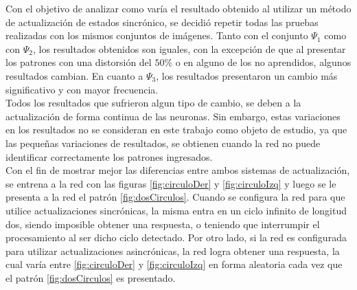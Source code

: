 \documentclass{sig-alternate}
\begin{document}
Con el objetivo de analizar como varía el resultado obtenido al utilizar un método de actualización de estados sincrónico, se decidió repetir todas las pruebas realizadas con los mismos conjuntos de imágenes. Tanto con el conjunto $\Psi_1$ como con $\Psi_2$, los resultados obtenidos son iguales, con la excepción de que al presentar los patrones con una distorsión del $50\%$ o en alguno de los no aprendidos, algunos resultados cambian. En cuanto a $\Psi_3$, los resultados presentaron un cambio más significativo y con mayor frecuencia.\\
Todos los resultados que sufrieron algun tipo de cambio, se deben a la actualización de forma continua de las neuronas. Sin embargo, estas variaciones en los resultados no se consideran en este trabajo como objeto de estudio, ya que las pequeñas variaciones de resultados, se obtienen cuando la red no puede identificar correctamente los patrones ingresados.\\
Con el fin de mostrar mejor las diferencias entre ambos sistemas de actualización, se entrena a la red con las figuras \ref{fig:circuloDer} y \ref{fig:circuloIzq} y luego se le presenta a la red el patrón \ref{fig:dosCirculos}. Cuando se configura la red para que utilice actualizaciones sincrónicas, la misma entra en un ciclo infinito de longitud dos, siendo imposible obtener una respuesta, o teniendo que interrumpir el procesamiento al ser dicho ciclo detectado. Por otro lado, si la red es configurada para utilizar actualizaciones asincrónicas, la red logra obtener una respuesta, la cual varía entre \ref{fig:circuloDer} y \ref{fig:circuloIzq}  en forma aleatoria cada vez que el patrón \ref{fig:dosCirculos} es presentado.
\end{document}
